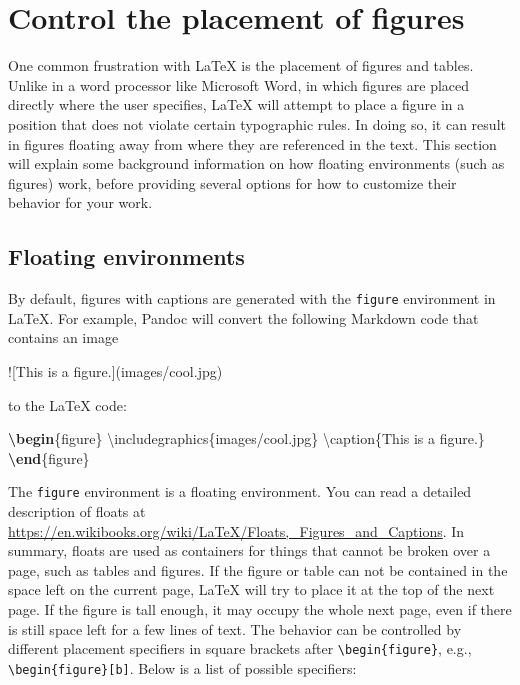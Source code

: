 \documentclass[
  11pt,
]{krantz}
\newenvironment{Shaded}{\begin{snugshade}}{\end{snugshade}}
\newcommand{\AlertTok}[1]{\textcolor[rgb]{0.33,0.33,0.33}{#1}}
\newcommand{\BuiltInTok}[1]{#1}
\newcommand{\ExtensionTok}[1]{#1}
\newcommand{\FunctionTok}[1]{\textcolor[rgb]{0,0,0}{#1}}
\newcommand{\KeywordTok}[1]{\textcolor[rgb]{0.27,0.27,0.27}{\textbf{#1}}}
\newcommand{\NormalTok}[1]{#1}
\begin{document}
\hypertarget{figure-placement}{%
\section{Control the placement of figures}\label{figure-placement}}

One common frustration with LaTeX is the placement of figures and tables. Unlike in a word processor like Microsoft Word, in which figures are placed directly where the user specifies, LaTeX will attempt to place a figure in a position that does not violate certain typographic rules. In doing so, it can result in figures floating away from where they are referenced in the text. This section will explain some background information on how floating environments (such as figures) work, before providing several options for how to customize their behavior for your work.

\hypertarget{floating-environments}{%
\subsection{Floating environments}\label{floating-environments}}

By default, figures with captions are generated with the \texttt{figure} environment in LaTeX. For example, Pandoc will convert the following Markdown code that contains an image

\begin{Shaded}
\begin{Highlighting}[]
\AlertTok{![This is a figure.](images/cool.jpg)}
\end{Highlighting}
\end{Shaded}

to the LaTeX code:

\begin{Shaded}
\begin{Highlighting}[]
\KeywordTok{\textbackslash{}begin}\NormalTok{\{}\ExtensionTok{figure}\NormalTok{\}}
  \BuiltInTok{\textbackslash{}includegraphics}\NormalTok{\{}\ExtensionTok{images/cool.jpg}\NormalTok{\}}
  \FunctionTok{\textbackslash{}caption}\NormalTok{\{This is a figure.\}}
\KeywordTok{\textbackslash{}end}\NormalTok{\{}\ExtensionTok{figure}\NormalTok{\}}
\end{Highlighting}
\end{Shaded}

The \texttt{figure} environment is a floating environment. You can read a detailed description of floats at \url{https://en.wikibooks.org/wiki/LaTeX/Floats,_Figures_and_Captions}. In summary, floats are used as containers for things that cannot be broken over a page, such as tables and figures. If the figure or table can not be contained in the space left on the current page, LaTeX will try to place it at the top of the next page. If the figure is tall enough, it may occupy the whole next page, even if there is still space left for a few lines of text. The behavior can be controlled by different placement specifiers in square brackets after \texttt{\textbackslash{}begin\{figure\}}, e.g., \texttt{\textbackslash{}begin\{figure\}{[}b{]}}. Below is a list of possible specifiers:
\end{document}
